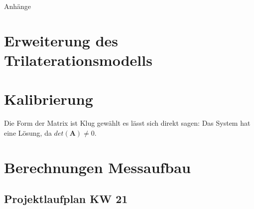 %
%
%
%

\begin{appendix}

\newpage

\begin{center}
	\huge{Anhänge}
\end{center}

\normalsize

\section{Erweiterung des Trilaterationsmodells}
\label{sec:extended_trilateration_model}


\newpage
	\section{Kalibrierung}
	\label{sec:coordinate_Measurements}
%
Die Form der Matrix ist Klug gewählt es lässt sich direkt sagen: Das System hat eine Lösung, da $det(\mathbf{A})\neq 0$.
	
\newpage
	\section{Berechnungen Messaufbau}
	\label{sec:coordinate_Measurements_Numerical}
%

		

\newpage
\begin{landscape}
	\section{Projektlaufplan KW 21}
	\label{sec:projectplan}
	\scalebox{.75}{
		
		}
\end{landscape}


\end{appendix}

